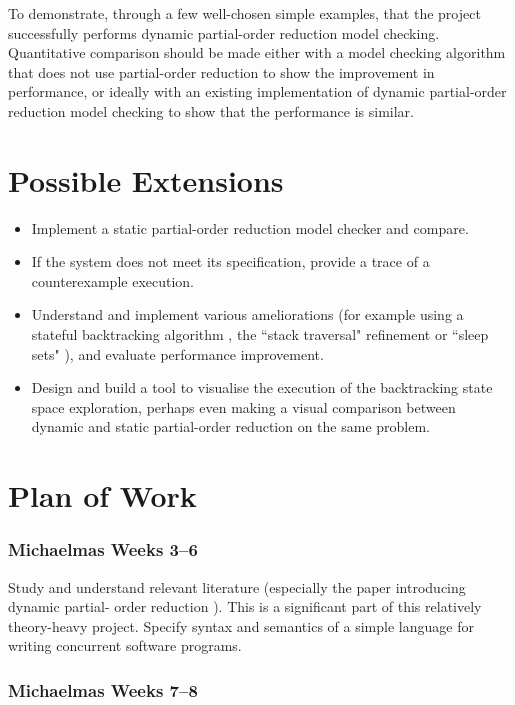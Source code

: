 \documentclass[12pt,a4paper,twoside]{article}
\begin{document}
To demonstrate, through a few well-chosen simple examples, that the project successfully
performs dynamic partial-order reduction model checking. Quantitative comparison should
be made either with a model checking algorithm that does not use partial-order reduction
to show the improvement in performance, or ideally with an existing implementation of dynamic
partial-order reduction model checking to show that the performance is similar.

\section*{Possible Extensions}

\begin{itemize}
	\item Implement a static partial-order reduction model checker
	and compare.
	
	\item If the system does not meet its specification, provide a trace
	of a counterexample execution.
	
	\item Understand and implement various ameliorations (for example using
	a stateful backtracking algorithm \cite{spin08}, the
	``stack traversal" refinement \cite{popl05} or ``sleep sets" \cite{god95}),
	and evaluate performance improvement.
	
	\item Design and build a tool to visualise the execution of the
	backtracking state space exploration,
	perhaps even making a visual
	comparison between dynamic and static partial-order reduction on
	the same problem.
\end{itemize}

\section*{Plan of Work}

\subsubsection*{Michaelmas Weeks 3--6}

Study and understand relevant literature (especially the paper introducing dynamic partial-
order reduction \cite{popl05}). This is a significant part of this relatively
theory-heavy project. Specify syntax and semantics of a simple language for writing
concurrent software programs.

\subsubsection*{Michaelmas Weeks 7--8}
\end{document}
